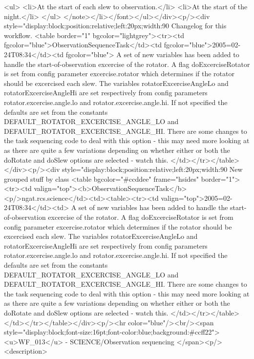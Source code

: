 		<ul>
	  		<li>At the start of each slew to observation.</li>
	  		<li>At the start of the night.</li>
		</ul>
      </note></li></font></ul></div><p/><div style="display:block;position:relative;left:20px;width:90%
      Changelog for this workflow.
      <table border="1" bgcolor="lightgrey"><tr><td fgcolor="blue">ObservationSequenceTask</td><td fgcolor="blue">2005=02-24T08:34</td><td fgcolor="blue">
	    	A set of new variables has been added to handle the start-of-observation excercise of the rotator.
	    	A flag doExcerciseRotator is set from config parameter excercise.rotator which
	    	determines if the rotator should be excercised each slew. The variables rotatorExcerciseAngleLo
	    	and rotatorExcerciseAngleHi are set respectively from config parameters
	    	rotator.excercise.angle.lo and rotator.excercise.angle.hi. If not specified the defaults
	    	are set from the constants DEFAULT_ROTATOR_EXCERCISE_ANGLE_LO and DEFAULT_ROTATOR_EXCERCISE_ANGLE_HI.
	    	There are some changes to the task sequencing code to deal with this option - this may need more
	      	looking at as there are quite a few variations depending on whether either or both the doRotate 
	      	and doSlew options are selected - watch this.
	  	</td></tr></table></div><p/><div style="display:block;position:relative;left:20px;width:90%
     New grouped stuff by class
     <table bgcolor="#ccddee" frame="hsides" border="1"><tr><td valign="top"><b>ObservationSequenceTask</b><p/>ngat.rcs.science</td><td><table><tr><td valign="top">2005=02-24T08:34</td><td>
	    	A set of new variables has been added to handle the start-of-observation excercise of the rotator.
	    	A flag doExcerciseRotator is set from config parameter excercise.rotator which
	    	determines if the rotator should be excercised each slew. The variables rotatorExcerciseAngleLo
	    	and rotatorExcerciseAngleHi are set respectively from config parameters
	    	rotator.excercise.angle.lo and rotator.excercise.angle.hi. If not specified the defaults
	    	are set from the constants DEFAULT_ROTATOR_EXCERCISE_ANGLE_LO and DEFAULT_ROTATOR_EXCERCISE_ANGLE_HI.
	    	There are some changes to the task sequencing code to deal with this option - this may need more
	      	looking at as there are quite a few variations depending on whether either or both the doRotate 
	      	and doSlew options are selected - watch this.
	  	</td></tr></table></td></tr></table></div><p/><hr color="blue"/><br/><span style="display:block;font-size:16pt;font-color:blue;background:#ccff22"><u>WF_013</u> -    SCIENCE/Observation sequencing </span><p/><description>
